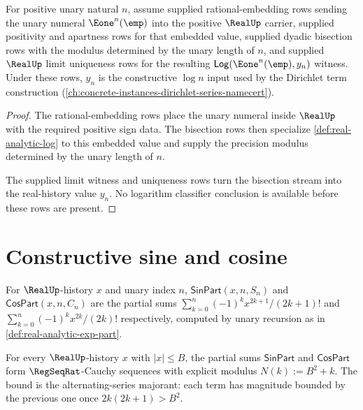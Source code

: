 \begin{theorem}
\label{thm:real-analytic-log-unary}
For positive unary natural $n$, assume supplied rational-embedding rows sending the unary numeral $\Eone^n(\emp)$ into the positive $\RealUp$ carrier, supplied positivity and apartness rows for that embedded value, supplied dyadic bisection rows with the modulus determined by the unary length of $n$, and supplied $\RealUp$ limit uniqueness rows for the resulting $\mathsf{Log}(\Eone^n(\emp),y_n)$ witness. Under these rows, $y_n$ is the constructive $\log n$ input used by the Dirichlet term construction (\autoref{ch:concrete-instances-dirichlet-series-namecert}).
\end{theorem}
\begin{proof}
The rational-embedding rows place the unary numeral inside $\RealUp$ with the required positive sign data. The bisection rows then specialize \autoref{def:real-analytic-log} to this embedded value and supply the precision modulus determined by the unary length of $n$.

The supplied limit witness and uniqueness rows turn the bisection stream into the real-history value $y_n$. No logarithm classifier conclusion is available before these rows are present.
\end{proof}

\section{Constructive sine and cosine}
\label{sec:real-analytic-trig}

\begin{definition}
\label{def:real-analytic-trig-part}
For \(\RealUp\)-history \(x\) and unary index \(n\), \(\mathsf{SinPart}(x, n, S_n)\) and \(\mathsf{CosPart}(x, n, C_n)\) are the partial sums \(\sum_{k=0}^{n} (-1)^k x^{2k+1}/(2k+1)!\) and \(\sum_{k=0}^{n} (-1)^k x^{2k}/(2k)!\) respectively, computed by unary recursion as in \autoref{def:real-analytic-exp-part}.
\end{definition}

\begin{lemma}
\label{lem:real-analytic-trig-cauchy}
For every \(\RealUp\)-history \(x\) with \(|x| \leq B\), the partial sums \(\mathsf{SinPart}\) and \(\mathsf{CosPart}\) form \(\RegSeqRat\)-Cauchy sequences with explicit modulus \(N(k) := B^2 + k\). The bound is the alternating-series majorant: each term has magnitude bounded by the previous one once \(2k(2k+1) > B^2\).
\end{lemma}

